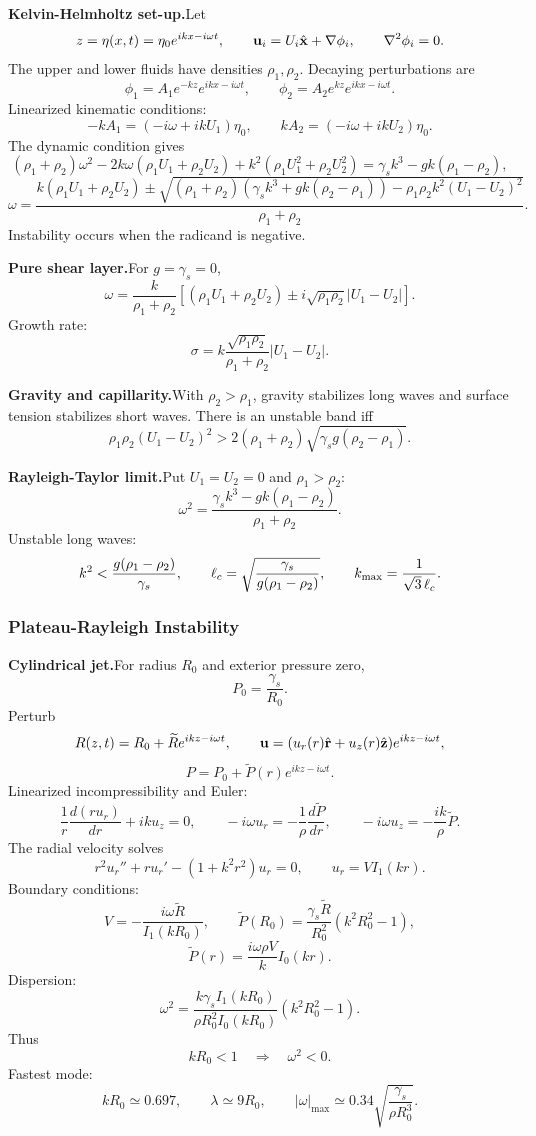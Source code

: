 \noindent\textbf{Kelvin-Helmholtz set-up.}\quad Let
\[
  z=\eta(x,t)=\eta_0e^{ikx-i\omega t},
  \qquad
  \mathbf{u}_i=U_i\hat{\mathbf x}+\nabla\phi_i,
  \qquad
  \nabla^2\phi_i=0.
\]
The upper and lower fluids have densities $\rho_1,\rho_2$. Decaying perturbations are
\[
  \phi_1=A_1e^{-kz}e^{ikx-i\omega t},
  \qquad
  \phi_2=A_2e^{kz}e^{ikx-i\omega t}.
\]
Linearized kinematic conditions:
\[
  -kA_1=(-i\omega+ikU_1)\eta_0,
  \qquad
  kA_2=(-i\omega+ikU_2)\eta_0.
\]
The dynamic condition gives
\[
  (\rho_1+\rho_2)\omega^2
  -2k\omega(\rho_1U_1+\rho_2U_2)
  +k^2(\rho_1U_1^2+\rho_2U_2^2)
  =\gamma_s k^3-gk(\rho_1-\rho_2),
\]
\[
  \boxed{\omega=\frac{k(\rho_1U_1+\rho_2U_2)\pm
  \sqrt{(\rho_1+\rho_2)(\gamma_s k^3+gk(\rho_2-\rho_1))
  -\rho_1\rho_2k^2(U_1-U_2)^2}}{\rho_1+\rho_2}}.
\]
Instability occurs when the radicand is negative.

\noindent\textbf{Pure shear layer.}\quad For $g=\gamma_s=0$,
\[
  \boxed{\omega=\frac{k}{\rho_1+\rho_2}
  \left[(\rho_1U_1+\rho_2U_2)\pm i\sqrt{\rho_1\rho_2}|U_1-U_2|\right]}.
\]
Growth rate:
\[
  \sigma=k\frac{\sqrt{\rho_1\rho_2}}{\rho_1+\rho_2}|U_1-U_2|.
\]

\noindent\textbf{Gravity and capillarity.}\quad With $\rho_2>\rho_1$, gravity stabilizes long waves and surface tension stabilizes short waves. There is an unstable band iff
\[
  \boxed{\rho_1\rho_2(U_1-U_2)^2>
  2(\rho_1+\rho_2)\sqrt{\gamma_sg(\rho_2-\rho_1)}}.
\]

\noindent\textbf{Rayleigh-Taylor limit.}\quad Put $U_1=U_2=0$ and $\rho_1>\rho_2$:
\[
  \boxed{\omega^2=\frac{\gamma_s k^3-gk(\rho_1-\rho_2)}{\rho_1+\rho_2}}.
\]
Unstable long waves:
\[
  k^2<\frac{g(\rho_1-\rho_2)}{\gamma_s},
  \qquad
  \ell_c=\sqrt{\frac{\gamma_s}{g(\rho_1-\rho_2)}},
  \qquad
  k_{\rm max}=\frac{1}{\sqrt3\,\ell_c}.
\]

\subsubsection*{Plateau-Rayleigh Instability}

\noindent\textbf{Cylindrical jet.}\quad For radius $R_0$ and exterior pressure zero,
\[
  P_0=\frac{\gamma_s}{R_0}.
\]
Perturb
\[
  R(z,t)=R_0+\widetilde R e^{ikz-i\omega t},
  \qquad
  \mathbf{u}=(u_r(r)\hat{\mathbf r}+u_z(r)\hat{\mathbf z})e^{ikz-i\omega t},
\]
\[
  P=P_0+\widetilde P(r)e^{ikz-i\omega t}.
\]
Linearized incompressibility and Euler:
\[
  \frac1r\frac{d(ru_r)}{dr}+iku_z=0,
  \qquad
  -i\omega u_r=-\frac1\rho\frac{d\widetilde P}{dr},
  \qquad
  -i\omega u_z=-\frac{ik}{\rho}\widetilde P.
\]
The radial velocity solves
\[
  r^2u_r''+ru_r'-(1+k^2r^2)u_r=0,
  \qquad
  u_r=V I_1(kr).
\]
Boundary conditions:
\[
  V=-\frac{i\omega\widetilde R}{I_1(kR_0)},
  \qquad
  \widetilde P(R_0)=\frac{\gamma_s\widetilde R}{R_0^2}(k^2R_0^2-1),
\]
\[
  \widetilde P(r)=\frac{i\omega\rho V}{k}I_0(kr).
\]
Dispersion:
\[
  \boxed{\omega^2=
  \frac{k\gamma_s I_1(kR_0)}{\rho R_0^2 I_0(kR_0)}
  (k^2R_0^2-1)}.
\]
Thus
\[
  kR_0<1\quad\Longrightarrow\quad \omega^2<0.
\]
Fastest mode:
\[
  kR_0\simeq0.697,\qquad
  \lambda\simeq9R_0,\qquad
  |\omega|_{\max}\simeq0.34\sqrt{\frac{\gamma_s}{\rho R_0^3}}.
\]

